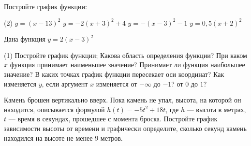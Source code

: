 \begin{homework}[number=2]
	\begin{listofex}
		\item Постройте график функции:
		\begin{tasks}(2)
			\task \( y=(x-13)^2 \)
			\task \( y=-2(x+3)^2+4 \)
			\task \( y=-(x-3)^2-1 \)
			\task \( y=0,5(x+2)^2 \)
		\end{tasks}
		\item Дана функция \( y=2(x-3)^2 \)
		\begin{tasks}(1)
			\task Постройте график функции;
			\task Какова область определения функции?
			\task При каком \( x \) функция принимает наименьшее значение? Принимает ли функция наибольшее значение?
			\task В каких точках график функции пересекает оси координат?
			\task Как изменяется \( y \), если аргумент \( x \) изменяется от \( -\infty  \) до \( -1 \)? от \( 0 \) до \( 1 \)?
		\end{tasks}
		\item Камень брошен вертикально вверх. Пока камень не упал, высота, на которой он находится, описывается формулой \( h(t)=-5t^2+18t \), где \( h \) --- высота в метрах, \( t \) --- время в секундах, прошедшее с момента броска. Постройте график зависимости высоты от времени и графически определите, сколько секунд камень находился на высоте не менее \( 9 \) метров.
	\end{listofex}
\end{homework}

